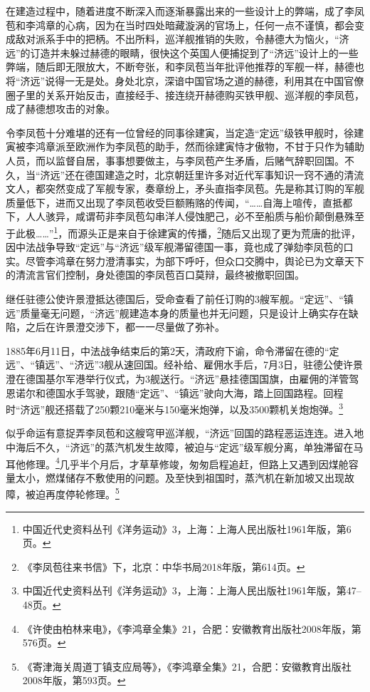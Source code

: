 \documentclass[12pt,UTF8]{ctexbook}
\begin{document}
在建造过程中，随着进度不断深入而逐渐暴露出来的一些设计上的弊端，成了李凤苞和李鸿章的心病，因为在当时四处暗藏漩涡的官场上，任何一点不谨慎，都会变成敌对派系手中的把柄。不出所料，巡洋舰推销的失败，令赫德大为恼火，“济远”的订造并未躲过赫德的眼睛，很快这个英国人便捕捉到了“济远”设计上的一些弊端，随后即无限放大，不断夸张，和李凤苞当年批评他推荐的军舰一样，赫德也将“济远”说得一无是处。身处北京，深谙中国官场之道的赫德，利用其在中国官僚圈子里的关系开始反击，直接经手、接连绕开赫德购买铁甲舰、巡洋舰的李凤苞，成了赫德想攻击的对象。

令李凤苞十分难堪的还有一位曾经的同事徐建寅，当定造“定远”级铁甲舰时，徐建寅被李鸿章派至欧洲作为李凤苞的助手，然而徐建寅恃才傲物，不甘于只作为辅助人员，而以监督自居，事事想要做主，与李凤苞产生矛盾，后赌气辞职回国。不久，当“济远”还在德国建造之时，北京朝廷里许多对近代军事知识一窍不通的清流文人，都突然变成了军舰专家，奏章纷上，矛头直指李凤苞。先是称其订购的军舰质量低下，进而又出现了李凤苞收受巨额贿赂的传闻，“……自海上喧传，直抵都下，人人骇异，咸谓苟非李凤苞勾串洋人侵蚀肥己，必不至船质与船价颠倒悬殊至于此极……”\footnote{中国近代史资料丛刊《洋务运动》3，上海：上海人民出版社1961年版，第6页。}，而源头正是来自于徐建寅的传播，\footnote{《李凤苞往来书信》下，北京：中华书局2018年版，第614页。}随后又出现了更为荒唐的批评，因中法战争导致“定远”与“济远”级军舰滞留德国一事，竟也成了弹劾李凤苞的口实。尽管李鸿章在努力澄清事实，为部下呼吁，但众口交腾中，舆论已为文章天下的清流言官们控制，身处德国的李凤苞百口莫辩，最终被撤职回国。

继任驻德公使许景澄抵达德国后，受命查看了前任订购的3艘军舰。“定远”、“镇远”质量毫无问题，“济远”舰建造本身的质量也并无问题，只是设计上确实存在缺陷，之后在许景澄交涉下，都一一尽量做了弥补。

1885年6月11日，中法战争结束后的第2天，清政府下谕，命令滞留在德的“定远”、“镇远”、“济远”3舰从速回国。经补给、雇佣水手后，7月3日，驻德公使许景澄在德国基尔军港举行仪式，为3舰送行。“济远”悬挂德国国旗，由雇佣的洋管驾恩诺尔和德国水手驾驶，跟随“定远”、“镇远”驶向大海，踏上回国路程。回程时“济远”舰还搭载了250颗210毫米与150毫米炮弹，以及3500颗机关炮炮弹。\footnote{中国近代史资料丛刊《洋务运动》3，上海：上海人民出版社1961年版，第47--48页。}

似乎命运有意捉弄李凤苞和这艘穹甲巡洋舰，“济远”回国的路程恶运连连。进入地中海后不久，“济远”的蒸汽机发生故障，被迫与“定远”级军舰分离，单独滞留在马耳他修理。\footnote{《许使由柏林来电》，《李鸿章全集》21，合肥：安徽教育出版社2008年版，第576页。}几乎半个月后，才草草修竣，匆匆启程追赶，但路上又遇到因煤舱容量太小，燃煤储存不敷使用的问题。及至快到祖国时，蒸汽机在新加坡又出现故障，被迫再度停轮修理。\footnote{《寄津海关周道丁镇支应局等》，《李鸿章全集》21，合肥：安徽教育出版社2008年版，第593页。}
\end{document}
